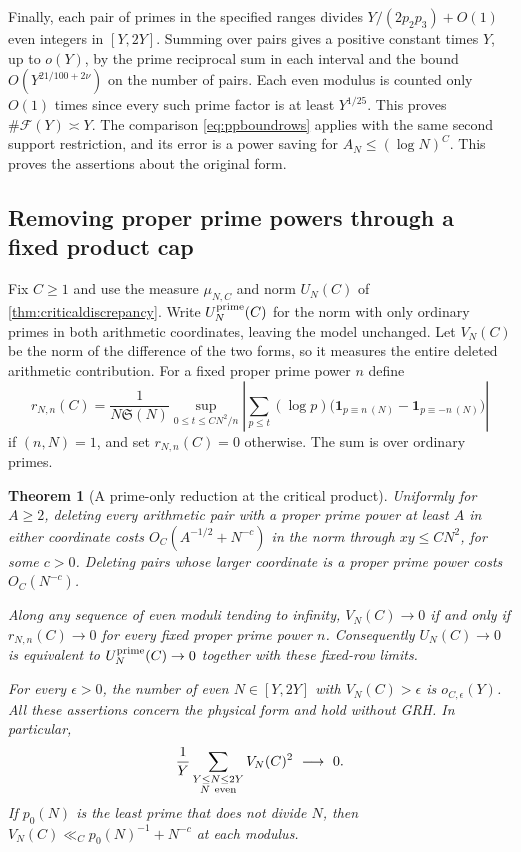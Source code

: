 \documentclass[11pt,a4paper]{article}
\numberwithin{equation}{section}
\newtheorem{theorem}{Theorem}[section]
\newcommand{\SSS}{\mathfrak S}
\begin{document}
Finally, each pair of primes in the specified ranges
divides $Y/(2p_2p_3)+O(1)$ even integers in $[Y,2Y]$.
Summing over pairs gives a positive constant times $Y$,
up to $o(Y)$, by the prime reciprocal sum in each interval
and the bound $O(Y^{21/100+2\nu})$ on the number of pairs.
Each even modulus is counted only $O(1)$ times since
every such prime factor is at least $Y^{1/25}$. This proves
$\#\mathcal F(Y)\asymp Y$. The comparison
\cref{eq:ppboundrows} applies with the same second support
restriction, and its error is a power saving for
$A_N\le(\log N)^C$. This proves the assertions about the
original form.

\subsection{Removing proper prime powers through a fixed product cap}

Fix $C\ge1$ and use the measure $\mu_{N,C}$ and norm
$U_N(C)$ of \cref{thm:criticaldiscrepancy}.
Write $U_N^{\rm prime}(C)$ for the norm with only ordinary
primes in both arithmetic coordinates, leaving the model
unchanged. Let $V_N(C)$ be the norm of the difference of
the two forms, so it measures the entire deleted arithmetic
contribution. For a fixed proper prime power $n$ define
\begin{equation}
 r_{N,n}(C)=\frac1{N\SSS(N)}
    \sup_{0\le t\le CN^2/n}
      \left|\sum_{p\le t}(\log p)
         \bigl(\mathbf1_{p\equiv n\ (N)}
                -\mathbf1_{p\equiv -n\ (N)}\bigr)\right|
 \label{eq:primepowerrow}
\end{equation}
if $(n,N)=1$, and set $r_{N,n}(C)=0$ otherwise. The sum
is over ordinary primes.

\begin{samepage}
\begin{theorem}[A prime-only reduction at the critical product]
\label{thm:criticalpowers}
Uniformly for $A\ge2$, deleting every arithmetic pair
with a proper prime power at least $A$ in either coordinate
costs $O_C(A^{-1/2}+N^{-c})$ in the norm through $xy\le CN^2$,
for some $c>0$. Deleting pairs whose larger coordinate
is a proper prime power costs $O_C(N^{-c})$.

Along any sequence of even moduli tending to infinity,
$V_N(C)\to0$ if and only if $r_{N,n}(C)\to0$ for every
fixed proper prime power $n$. Consequently $U_N(C)\to0$
is equivalent to $U_N^{\rm prime}(C)\to0$ together with
these fixed-row limits.

For every $\epsilon>0$, the number of even $N\in[Y,2Y]$
with $V_N(C)>\epsilon$ is $o_{C,\epsilon}(Y)$. All these
assertions concern the physical form and hold without GRH.
In particular,
\[
 \frac{1}{Y}\sum_{\substack{Y\le N\le2Y\\ N\ {\rm even}}}
                         V_N(C)^2 \ \longrightarrow\ 0 .
\]
If $p_0(N)$ is the least prime that does not divide $N$,
then $V_N(C)\ll_C p_0(N)^{-1}+N^{-c}$ at each modulus.
\end{theorem}
\end{samepage}
\end{document}
